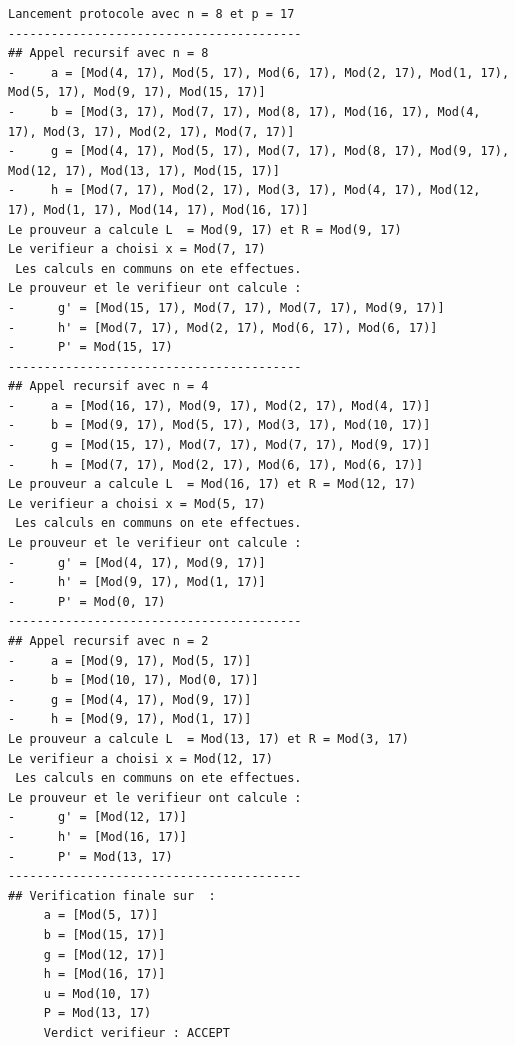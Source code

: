 \documentclass[a4paper]{article}
\theoremstyle{theorem}
\theoremstyle{definition}
\begin{document}
\begin{Verbatim}[frame=single, fontsize=\scriptsize]
Lancement protocole avec n = 8 et p = 17
-----------------------------------------
## Appel recursif avec n = 8
-     a = [Mod(4, 17), Mod(5, 17), Mod(6, 17), Mod(2, 17), Mod(1, 17), Mod(5, 17), Mod(9, 17), Mod(15, 17)]
-     b = [Mod(3, 17), Mod(7, 17), Mod(8, 17), Mod(16, 17), Mod(4, 17), Mod(3, 17), Mod(2, 17), Mod(7, 17)]
-     g = [Mod(4, 17), Mod(5, 17), Mod(7, 17), Mod(8, 17), Mod(9, 17), Mod(12, 17), Mod(13, 17), Mod(15, 17)]
-     h = [Mod(7, 17), Mod(2, 17), Mod(3, 17), Mod(4, 17), Mod(12, 17), Mod(1, 17), Mod(14, 17), Mod(16, 17)]  
Le prouveur a calcule L  = Mod(9, 17) et R = Mod(9, 17)  
Le verifieur a choisi x = Mod(7, 17)  
 Les calculs en communs on ete effectues.  
Le prouveur et le verifieur ont calcule :   
-      g' = [Mod(15, 17), Mod(7, 17), Mod(7, 17), Mod(9, 17)] 
-      h' = [Mod(7, 17), Mod(2, 17), Mod(6, 17), Mod(6, 17)] 
-      P' = Mod(15, 17)
-----------------------------------------
## Appel recursif avec n = 4
-     a = [Mod(16, 17), Mod(9, 17), Mod(2, 17), Mod(4, 17)]
-     b = [Mod(9, 17), Mod(5, 17), Mod(3, 17), Mod(10, 17)]
-     g = [Mod(15, 17), Mod(7, 17), Mod(7, 17), Mod(9, 17)]
-     h = [Mod(7, 17), Mod(2, 17), Mod(6, 17), Mod(6, 17)]  
Le prouveur a calcule L  = Mod(16, 17) et R = Mod(12, 17)  
Le verifieur a choisi x = Mod(5, 17)  
 Les calculs en communs on ete effectues.  
Le prouveur et le verifieur ont calcule :   
-      g' = [Mod(4, 17), Mod(9, 17)] 
-      h' = [Mod(9, 17), Mod(1, 17)] 
-      P' = Mod(0, 17)
-----------------------------------------
## Appel recursif avec n = 2
-     a = [Mod(9, 17), Mod(5, 17)]
-     b = [Mod(10, 17), Mod(0, 17)]
-     g = [Mod(4, 17), Mod(9, 17)]
-     h = [Mod(9, 17), Mod(1, 17)]  
Le prouveur a calcule L  = Mod(13, 17) et R = Mod(3, 17)  
Le verifieur a choisi x = Mod(12, 17)  
 Les calculs en communs on ete effectues.  
Le prouveur et le verifieur ont calcule :   
-      g' = [Mod(12, 17)] 
-      h' = [Mod(16, 17)] 
-      P' = Mod(13, 17)
-----------------------------------------
## Verification finale sur  :  
     a = [Mod(5, 17)]  
     b = [Mod(15, 17)]  
     g = [Mod(12, 17)]  
     h = [Mod(16, 17)]  
     u = Mod(10, 17)  
     P = Mod(13, 17)  
     Verdict verifieur : ACCEPT

\end{Verbatim}
\end{document}
